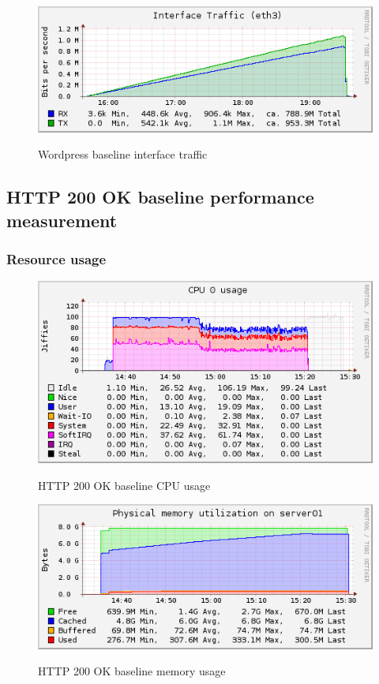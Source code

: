 \documentclass[Measurement results]{subfiles}
\begin{document}
\begin{figure}[H]
\centering
\caption{Wordpress baseline interface traffic}
\includegraphics[scale=0.7]{images/results/baseline_wp/interface.png}
\label{fig:Baseline Nginx interface traffic}
\end{figure}

\subsection{HTTP 200 OK baseline performance measurement}

\subsubsection{Resource usage}
\begin{figure}[H]
\centering
\caption{HTTP 200 OK baseline CPU usage}
\includegraphics[scale=0.7]{images/results/baseline_200/cpu.png}
\label{fig:Baseline Nginx CPU usage}
\end{figure}

\begin{figure}[H]
\centering
\caption{HTTP 200 OK baseline memory usage}
\includegraphics[scale=0.7]{images/results/baseline_200/memory.png}
\label{fig:Baseline Nginx memory usage}
\end{figure}
\end{document}
